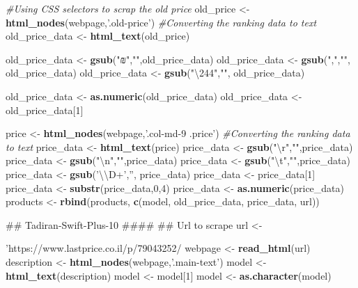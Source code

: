 \documentclass[]{article}
\newenvironment{Shaded}{\begin{snugshade}}{\end{snugshade}}
\newcommand{\KeywordTok}[1]{\textcolor[rgb]{0.13,0.29,0.53}{\textbf{#1}}}
\newcommand{\DecValTok}[1]{\textcolor[rgb]{0.00,0.00,0.81}{#1}}
\newcommand{\CharTok}[1]{\textcolor[rgb]{0.31,0.60,0.02}{#1}}
\newcommand{\StringTok}[1]{\textcolor[rgb]{0.31,0.60,0.02}{#1}}
\newcommand{\CommentTok}[1]{\textcolor[rgb]{0.56,0.35,0.01}{\textit{#1}}}
\newcommand{\NormalTok}[1]{#1}
\begin{document}
\begin{Shaded}
\begin{Highlighting}[]
{{{{{{\CommentTok{#Using CSS selectors to scrap the old price}
\NormalTok{old_price <-}\StringTok{ }\KeywordTok{html_nodes}\NormalTok{(webpage,}\StringTok{'.old-price'}\NormalTok{)}
\CommentTok{#Converting the ranking data to text }
\NormalTok{old_price_data <-}\StringTok{ }\KeywordTok{html_text}\NormalTok{(old_price)}

\NormalTok{old_price_data <-}\StringTok{ }\KeywordTok{gsub}\NormalTok{(}\StringTok{"₪"}\NormalTok{,}\StringTok{""}\NormalTok{,old_price_data)}
\NormalTok{old_price_data <-}\StringTok{ }\KeywordTok{gsub}\NormalTok{(}\StringTok{","}\NormalTok{,}\StringTok{""}\NormalTok{, old_price_data)}
\NormalTok{old_price_data <-}\StringTok{ }\KeywordTok{gsub}\NormalTok{(}\StringTok{"\textbackslash{}244"}\NormalTok{,}\StringTok{""}\NormalTok{, old_price_data)}

\NormalTok{old_price_data <-}\StringTok{ }\KeywordTok{as.numeric}\NormalTok{(old_price_data)}
\NormalTok{old_price_data <-}\StringTok{ }\NormalTok{old_price_data[}\DecValTok{1}\NormalTok{]}

\NormalTok{price <-}\StringTok{ }\KeywordTok{html_nodes}\NormalTok{(webpage,}\StringTok{'.col-md-9 .price'}\NormalTok{)}
\CommentTok{#Converting the ranking data to text }
\NormalTok{price_data <-}\StringTok{ }\KeywordTok{html_text}\NormalTok{(price)}
\NormalTok{price_data <-}\StringTok{ }\KeywordTok{gsub}\NormalTok{(}\StringTok{"}\CharTok{\textbackslash{}r}\StringTok{"}\NormalTok{,}\StringTok{""}\NormalTok{,price_data) }
\NormalTok{price_data <-}\StringTok{ }\KeywordTok{gsub}\NormalTok{(}\StringTok{"}\CharTok{\textbackslash{}n}\StringTok{"}\NormalTok{,}\StringTok{""}\NormalTok{,price_data) }
\NormalTok{price_data <-}\StringTok{ }\KeywordTok{gsub}\NormalTok{(}\StringTok{"}\CharTok{\textbackslash{}t}\StringTok{"}\NormalTok{,}\StringTok{""}\NormalTok{,price_data) }
\NormalTok{price_data <-}\StringTok{ }\KeywordTok{gsub}\NormalTok{(}\StringTok{'}\CharTok{\textbackslash{}\textbackslash{}}\StringTok{D+'}\NormalTok{,}\StringTok{''}\NormalTok{, price_data)}
\NormalTok{price_data <-}\StringTok{ }\NormalTok{price_data[}\DecValTok{1}\NormalTok{]}
\NormalTok{price_data <-}\StringTok{ }\KeywordTok{substr}\NormalTok{(price_data,}\DecValTok{0}\NormalTok{,}\DecValTok{4}\NormalTok{)}
\NormalTok{price_data <-}\StringTok{ }\KeywordTok{as.numeric}\NormalTok{(price_data)}
\NormalTok{products <-}\StringTok{ }\KeywordTok{rbind}\NormalTok{(products, }\KeywordTok{c}\NormalTok{(model, old_price_data, price_data, url))}


\NormalTok{## Tadiran-Swift-Plus-10 ####}
\NormalTok{## Url to scrape}
\NormalTok{url <-}\StringTok{'https://www.lastprice.co.il/p/79043252/%D7%9E%D7%96%D7%92%D7%9F-%D7%A2%D7%99%D7%9C%D7%99-Tadiran/Tadiran-Swift-Plus-10A'}
\NormalTok{webpage <-}\StringTok{ }\KeywordTok{read_html}\NormalTok{(url) }
\NormalTok{description <-}\StringTok{ }\KeywordTok{html_nodes}\NormalTok{(webpage,}\StringTok{'.main-text'}\NormalTok{)}
\NormalTok{model <-}\StringTok{ }\KeywordTok{html_text}\NormalTok{(description)}
\NormalTok{model <-}\StringTok{ }\NormalTok{model[}\DecValTok{1}\NormalTok{]}
\NormalTok{model <-}\StringTok{ }\KeywordTok{as.character}\NormalTok{(model)}

}}}}}}}
\end{Highlighting}
\end{Shaded}
\end{document}
